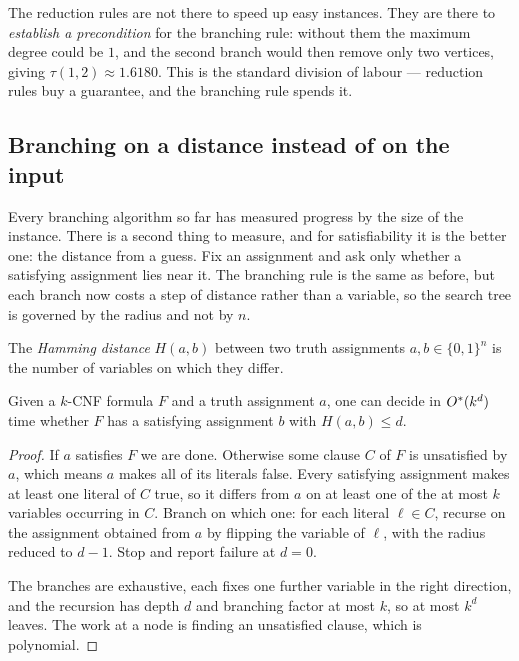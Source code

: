 \begin{intuition}
The reduction rules are not there to speed up easy instances. They are there to
\emph{establish a precondition} for the branching rule: without them the
maximum degree could be $1$, and the second branch would then remove only two
vertices, giving $\tau(1,2) \approx 1.6180$. This is the standard division of
labour --- reduction rules buy a guarantee, and the branching rule spends it.
\end{intuition}

\subsection{Branching on a distance instead of on the input}
\label{sec:hamming-ball}

Every branching algorithm so far has measured progress by the size of the
instance. There is a second thing to measure, and for satisfiability it is the
better one: the distance from a guess. Fix an assignment and ask only whether a
satisfying assignment lies near it. The branching rule is the same as before,
but each branch now costs a step of distance rather than a variable, so the
search tree is governed by the radius and not by $n$.

\begin{definition}\label{def:hamming}
The \emph{Hamming distance} $H(a,b)$ between two truth assignments
$a, b \in \{0,1\}^n$ is the number of variables on which they differ.
\end{definition}

\begin{lemma}\label{lem:hamming-ball}
Given a $k$-CNF formula $F$ and a truth assignment $a$, one can decide in
$O^{*}(k^d)$ time whether $F$ has a satisfying assignment $b$ with
$H(a,b) \le d$.
\end{lemma}

\begin{proof}
If $a$ satisfies $F$ we are done. Otherwise some clause $C$ of $F$ is
unsatisfied by $a$, which means $a$ makes all of its literals false. Every
satisfying assignment makes at least one literal of $C$ true, so it differs
from $a$ on at least one of the at most $k$ variables occurring in $C$. Branch
on which one: for each literal $\ell \in C$, recurse on the assignment obtained
from $a$ by flipping the variable of $\ell$, with the radius reduced to $d-1$.
Stop and report failure at $d = 0$.

The branches are exhaustive, each fixes one further variable in the right
direction, and the recursion has depth $d$ and branching factor at most $k$, so
at most $k^d$ leaves. The work at a node is finding an unsatisfied clause, which
is polynomial.
\end{proof}

